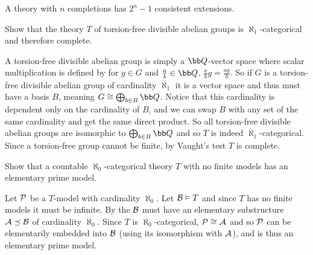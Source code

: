\bprop

    A theory with $n$ completions has $2^n-1$ consistent extensions.

\eprop

\bexerc

    Show that the theory $T$ of torsion-free divisible abelian groups is $\aleph_1$-categorical and therefore complete.

\eexerc

A torsion-free divisible abelian group is simply a ${\bb Q}$-vector space where scalar multiplication is defined by for $g\in G$ and $\frac ab\in{\bb Q}$, $\frac abg=\frac{ag}b$.
So if $G$ is a torsion-free divisible abelian group of cardinality $\aleph_1$ it is a vector space and thus must have a basis $B$, meaning $G\cong\bigoplus_{b\in B}{\bb Q}$.
Notice that this cardinality is dependent only on the cardinality of $B$, and we can swap $B$ with any set of the same cardinality and get the same direct product.
So all torsion-free divisible abelian groups are isomorphic to $\bigoplus_{b\in B}{\bb Q}$ and so $T$ is indeed $\aleph_1$-categorical.
Since a torsion-free group cannot be finite, by Vaught's test $T$ is complete.

\bexerc

    Show that a countable $\aleph_0$-categorical theory $T$ with no finite models has an elementary prime model.

\eexerc

Let ${\cal P}$ be a $T$-model with cardinality $\aleph_0$.
Let ${\cal B}\vDash T$ and since $T$ has no finite models it must be infinite.
By the  ${\cal B}$ must have an elementary substructure ${\cal A}\preceq{\cal B}$ of cardinality $\aleph_0$.
Since $T$ is $\aleph_0$-categorical, ${\cal P}\cong{\cal A}$ and so ${\cal P}$ can be elementarily embedded into ${\cal B}$ (using its isomorphism with ${\cal A}$), and is thus an elementary prime model.

